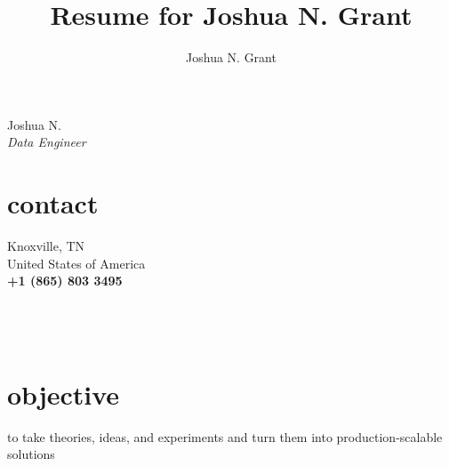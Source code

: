 \documentclass[10pt]{article}
\author{Joshua N. Grant}
\title{Resume for Joshua N. Grant}%
\begin{document}
\begin{minipage}[ht]{.3\linewidth} %
  \setlength{\headsep}{-10pt} %
  \setlength{\voffset}{-0.75in} %
  {\Large Joshua N. \LARGE{}} \\
  {\large \textit{Data Engineer}}
  \section*{\faUser{} contact}%
    \flushright%
    Knoxville, TN \\
    United States of America \\
    \textbf{+1 (865) 803 3495} \faMobile\\
    \href{mailto:jngrant@live.com}{\color{\linkcolor}{%
      jngrant@live.com \faEnvelope}} \\
    \href{https://notjustadatum.blogspot.com}{\color{linkcolor}{%
      notjustadatum.blogspot.com \faBold}} \\
    \href{https://github.com/sempervent}{\color{linkcolor}{%
      github.com/sempervent \faGithubAlt}} \\
    \href{https://www.linkedin.com/in/joshua-grant-a3842968/}{}
  \section*{\faBullseye{} objective}%
    \flushright{} to take theories, ideas, and experiments and turn them into %
    production-scalable solutions \flushleft%

\end{minipage}
\end{document}
